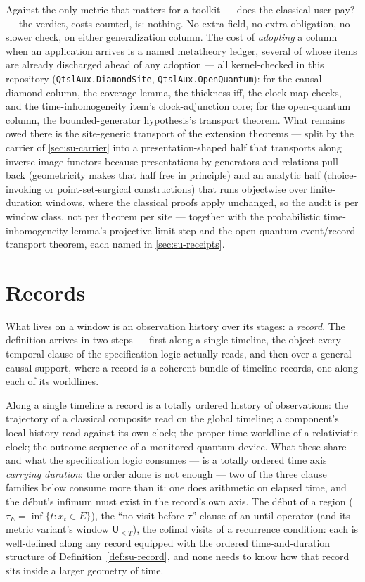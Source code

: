 Against the only metric that matters for a toolkit --- does the
classical user pay? --- the verdict, costs counted, is: nothing. No
extra
field, no extra obligation, no slower check, on either generalization
column. The cost of \emph{adopting} a column when an application arrives
is a named metatheory ledger, several of whose items are already
discharged ahead of any adoption --- all kernel-checked in this
repository (\texttt{QtslAux.DiamondSite},
\texttt{QtslAux.OpenQuantum}): for the causal-diamond
column, the coverage lemma, the thickness iff, the clock-map checks,
and the time-inhomogeneity item's clock-adjunction core; for the
open-quantum column, the bounded-generator hypothesis's transport
theorem. What remains
owed there is the site-generic transport of the extension theorems
--- split by the carrier of \autoref{sec:su-carrier} into a
presentation-shaped half that transports along inverse-image functors
because presentations by generators and relations pull back
(geometricity makes that half free in principle) and an analytic half
(choice-invoking or point-set-surgical constructions) that runs
objectwise over finite-duration windows, where the classical proofs
apply unchanged, so the audit is per window class, not per theorem
per site --- together with the probabilistic time-inhomogeneity
lemma's projective-limit step and the open-quantum event/record
transport theorem, each named in \autoref{sec:su-receipts}.
\section{Records}
\label{sec:su-records}

What lives on a window is an observation history over its stages: a
\emph{record}. The definition arrives in two steps --- first along a
single timeline, the object every temporal clause of the
specification logic actually reads, and then over a general causal
support, where a record is a coherent bundle of timeline records,
one along each of its worldlines.

Along a single timeline a record is a totally ordered history of
observations: the trajectory of a classical composite read on the
global timeline; a component's local history read against its own
clock; the proper-time worldline of a relativistic clock; the outcome
sequence of a monitored quantum device. What these share --- and what
the specification logic consumes --- is a totally ordered time axis
\emph{carrying duration}: the order alone is not enough --- two of
the three clause families below consume more than it: one does
arithmetic on elapsed time, and
the d\'ebut's infimum must exist in the record's own axis. The
d\'ebut of a region ($\tau_E = \inf\{t : x_t \in E\}$), the ``no
visit before $\tau$'' clause of an until operator (and its metric
variant's window $\mathsf{U}_{\le T}$), the cofinal visits of a
recurrence condition: each is well-defined along any record equipped
with the ordered time-and-duration structure of
Definition~\ref{def:su-record}, and none needs to know how that
record sits inside a larger geometry of time.

